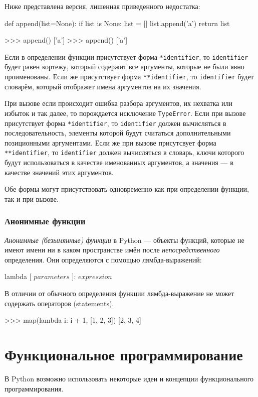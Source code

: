 Ниже представлена версия, лишенная приведенного недостатка:
\begin{pylst}{}{}
def append(list=None):
    if list is None:
        list = []
    list.append('a')
    return list

>>> append()
['a']
>>> append()
['a']
\end{pylst}

Если в определении функции присутствует форма \lstinline{*identifier}, то \lstinline{identifier} будет равен кортежу, который содержит все аргументы, которые не были явно проименованы. Если же присутствует форма \lstinline{**identifier}, то \lstinline{identifier} будет словарём, который отображет имена аргументов на их значения.

При вызове если происходит ошибка разбора аргументов, их нехватка или избыток и так далее, то порождается исключение \lstinline{TypeError}. Если при вызове присутствует форма \lstinline{*identifier}, то \lstinline{identifier} должен вычисляться в последовательность, элементы которой будут считаться дополнительными позиционными аргументами. Если же при вызове присутсвует форма \lstinline{**identifier}, то \lstinline{identifier} должен вычисляться в словарь, ключи которого будут использоваться в качестве именованных аргументов, а значения --- в качестве значений этих аргументов.

Обе формы могут присутствовать одновременно как при определении функции, так и при вызове.

\subsubsection{Анонимные функции}
\emph{Анонимные (безымянные) функции} в Python --- объекты функций, которые не имеют имени ни в каком пространстве имён после \emph{непосредственного} определения. Они определяются с помощью лямбда-выражений:
\begin{pylst}{}{}
lambda [ $parameters$ ]: $expression$
\end{pylst}

В отличии от обычного определения функции лямбда-выражение не может содержать операторов (statements).
\begin{pylst}{}{}
>>> map(lambda i: i + 1, [1, 2, 3])
[2, 3, 4]
\end{pylst}

\section{Функциональное программирование}
В Python возможно использовать некоторые идеи и концепции функционального программирования.

